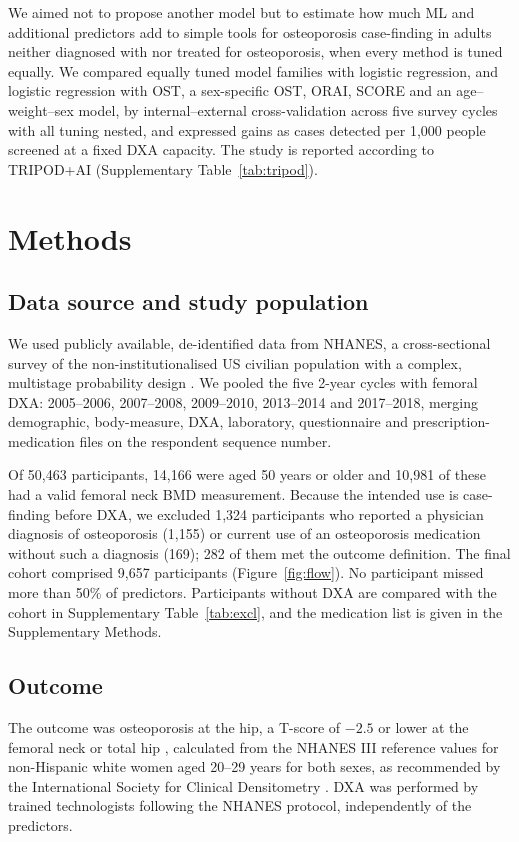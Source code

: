\documentclass[11pt,a4paper]{article}
\begin{document}
We aimed not to propose another model but to estimate how much ML and additional predictors add to simple tools for osteoporosis case-finding in adults neither diagnosed with nor treated for osteoporosis, when every method is tuned equally. We compared equally tuned model families with logistic regression, and logistic regression with OST, a sex-specific OST, ORAI, SCORE and an age--weight--sex model, by internal--external cross-validation across five survey cycles with all tuning nested, and expressed gains as cases detected per 1,000 people screened at a fixed DXA capacity. The study is reported according to TRIPOD+AI \cite{collins2024} (Supplementary Table~\ref{tab:tripod}).

\section{Methods}

\subsection{Data source and study population}
We used publicly available, de-identified data from NHANES, a cross-sectional survey of the non-institutionalised US civilian population with a complex, multistage probability design \cite{johnson2013,johnson2014}. We pooled the five 2-year cycles with femoral DXA: 2005--2006, 2007--2008, 2009--2010, 2013--2014 and 2017--2018, merging demographic, body-measure, DXA, laboratory, questionnaire and prescription-medication files on the respondent sequence number.

Of 50,463 participants, 14,166 were aged 50 years or older and 10,981 of these had a valid femoral neck BMD measurement. Because the intended use is case-finding before DXA, we excluded 1,324 participants who reported a physician diagnosis of osteoporosis (1,155) or current use of an osteoporosis medication without such a diagnosis (169); 282 of them met the outcome definition. The final cohort comprised 9,657 participants (Figure~\ref{fig:flow}). No participant missed more than 50\% of predictors. Participants without DXA are compared with the cohort in Supplementary Table~\ref{tab:excl}, and the medication list is given in the Supplementary Methods.

\subsection{Outcome}
The outcome was osteoporosis at the hip, a T-score of $-2.5$ or lower at the femoral neck or total hip \cite{kanis1994}, calculated from the NHANES III reference values for non-Hispanic white women aged 20--29 years \cite{looker1998} for both sexes, as recommended by the International Society for Clinical Densitometry \cite{watts2013}. DXA was performed by trained technologists following the NHANES protocol, independently of the predictors.
\end{document}
